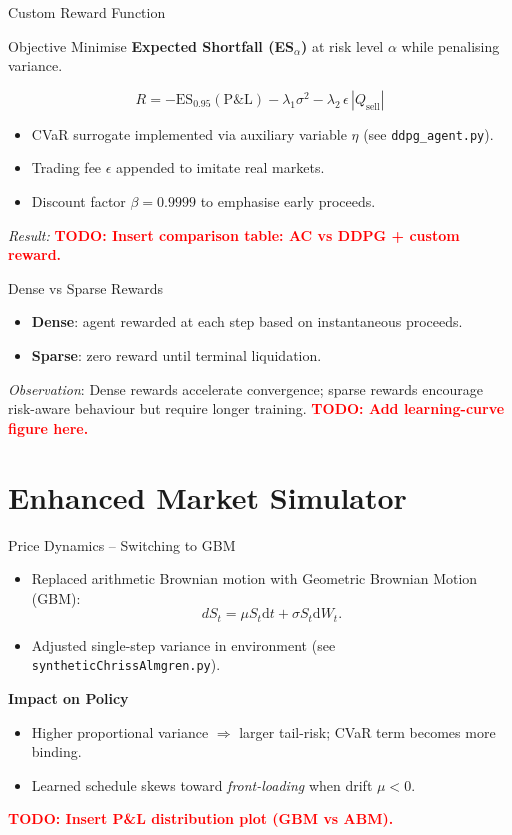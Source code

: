 \documentclass[11pt]{beamer}
\newcommand{\todo}[1]{\textcolor{red}{\bf TODO: #1}}
\newcommand{\code}[1]{\texttt{#1}}
\begin{document}
	\begin{frame}{Custom Reward Function}
		\begin{block}{Objective}
			Minimise \textbf{Expected Shortfall (ES$_\alpha$)} at risk level $\alpha$ while penalising variance.
		\end{block}
		\vspace{-0.3cm}
		\[
		R = -\mathrm{ES}_{0.95}(\mathrm{P\&L}) - \lambda_1 \sigma^2 - \lambda_2\,\epsilon\,|Q_{\mathrm{sell}}|
		\]
		\begin{itemize}
			\item CVaR surrogate implemented via auxiliary variable $\eta$ (see \code{ddpg_agent.py}).
			\item Trading fee $\epsilon$ appended to imitate real markets.
			\item Discount factor $\beta=0.9999$ to emphasise early proceeds.
		\end{itemize}
		\vspace{0.5em}
		\textit{Result:} \todo{Insert comparison table: AC vs DDPG + custom reward.}
	\end{frame}
	
	\begin{frame}{Dense vs Sparse Rewards}
		\begin{itemize}
			\item \textbf{Dense}: agent rewarded at each step based on instantaneous proceeds.
			\item \textbf{Sparse}: zero reward until terminal liquidation.
		\end{itemize}
		\pause
		\textit{Observation}: Dense rewards accelerate convergence; sparse rewards encourage risk-aware behaviour but require longer training.
		\vspace{0.5em}
		\todo{Add learning-curve figure here.}
	\end{frame}
	
	\section{Enhanced Market Simulator}
	
	\begin{frame}{Price Dynamics – Switching to GBM}
		\begin{itemize}
			\item Replaced arithmetic Brownian motion with Geometric Brownian Motion (GBM):
			\[ dS_t = \mu S_t \mathrm{d}t + \sigma S_t \mathrm{d}W_t. \]
			\item Adjusted single-step variance in environment (see \code{syntheticChrissAlmgren.py}).
		\end{itemize}
		\vspace{0.5em}
		\textbf{Impact on Policy}
		\begin{itemize}
			\item Higher proportional variance $\Rightarrow$ larger tail-risk; CVaR term becomes more binding.
			\item Learned schedule skews toward \emph{front-loading} when drift $\mu<0$.
		\end{itemize}
		\todo{Insert P&L distribution plot (GBM vs ABM).}
	\end{frame}
	
\end{document}
